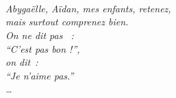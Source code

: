 \documentclass[12pt,twoside,a4paper,english,french]{book} %
\begin{document}
\begin{titlepage}
\end{titlepage}
\thispagestyle{empty}

\cleardoublepage




% 
% 
% 

{\Large
~\\
~\\
~\\
~\\
~\\
~\\
~\\
~\\
~\\
~\\
~\\
~\\
~\\
\begin{flushright}
\textit{
Abygaëlle, Aïdan, mes enfants, retenez,\\ mais surtout \emph{comprenez} bien.\\
On ne dit pas ~:\\
``C'est pas bon !'',\\
on dit~:\\
``Je n'aime pas.''\\
\ldots \\
}
\end{flushright}
}
\newpage
\end{document}
